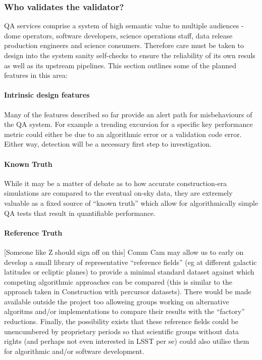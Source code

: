 \subsubsection{Who validates the validator?}
\label{sec:qaSelfValidation}

QA services comprise a system of high semantic value to multiple audiences - dome operators, software developers, science operations staff, data release production engineers and science consumers. Therefore care must be taken to design into the system sanity self-checks to ensure the reliability of its own resuls as well as its upstream pipelines. This section outlines some of the planned features in this area:

\paragraph{Intrinsic design features}

Many of the features described so far provide an alert path for misbehaviours of the QA system. For example a trending excursion for a specific key performance metric could either be due to an algorithmic error or a validation code error. Either way, detection will be a necessary first step to investigation.

\paragraph{Known Truth}

While it may be a matter of debate as to how accurate construction-era
simulations are compared to the eventual on-sky data, they are extremely valuable as a fixed source of ``known truth'' which allow for algorithmically simple QA tests that result in quantifiable performance.

\paragraph{Reference Truth}

[Someone like Z should sign off on this] Comm Cam may allow us to early on develop a small library of representative ``reference fields'' (eg at different galactic latitudes or ecliptic planes) to provide a minimal standard dataset against which competing algorithmic approaches can be compared (this is similar to the approach taken in Construction with percursor datasets). There would be made available outside the project too alloweing groups working on alternative algoritms and/or implementations to compare their results with the ``factory'' reductions. Finally, the possibility exists that these reference fields could be unencumbered by proprietary periods so that scientific groups without data rights (and perhaps not even interested in LSST per se) could also utilise them for algorithmic and/or software development.
